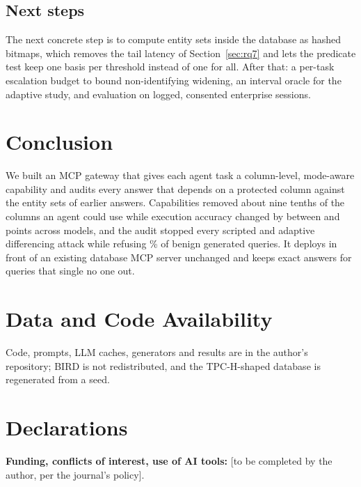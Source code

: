 \documentclass[10pt,journal,compsoc]{IEEEtran}
\begin{document}
\subsection{Next steps}
The next concrete step is to compute entity sets inside the database as hashed bitmaps, which removes the tail latency of Section~\ref{sec:rq7} and lets the predicate test keep one basis per threshold instead of one for all. After that: a per-task escalation budget to bound non-identifying widening, an interval oracle for the adaptive study, and evaluation on logged, consented enterprise sessions.

\section{Conclusion}\label{sec:conclusion}
We built an MCP gateway that gives each agent task a column-level, mode-aware capability and audits every answer that depends on a protected column against the entity sets of earlier answers. Capabilities removed about nine tenths of the columns an agent could use while execution accuracy changed by between \NdEscs{} and \NdEscm{} points across models, and the audit stopped every scripted and adaptive differencing attack while refusing \Nrefkthreelinear\% of benign generated queries. It deploys in front of an existing database MCP server unchanged and keeps exact answers for queries that single no one out.

\section*{Data and Code Availability}
Code, prompts, LLM caches, generators and results are in the author's repository; BIRD is not redistributed, and the TPC-H-shaped database is regenerated from a seed.

\section*{Declarations}
\textbf{Funding, conflicts of interest, use of AI tools:} [to be completed by the author, per the journal's policy].



\end{document}
